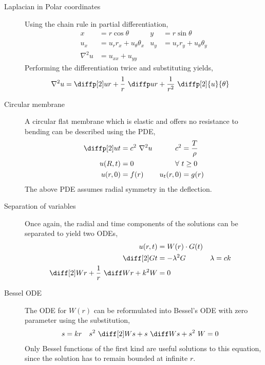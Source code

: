 \begin{description}
    \item[Laplacian in Polar coordinates] Using the chain rule in partial
        differentiation,
        \begin{align}
            x          & = r \cos \theta               &
            y          & = r \sin \theta                 \\
            u_x        & = u_r r_x + u_\theta \theta_x &
            u_y        & = u_r r_y + u_\theta \theta_y   \\
            \nabla^2 u & = u_{xx} + u_{yy}
        \end{align}
        Performing the differentiation twice and substituting yields,
        \begin{align}
            \nabla^2 u & = \diffp[2] ur + \frac{1}{r}\ \diffp ur + \frac{1}{r^2}
            \ \diffp[2] {u}{\theta}
        \end{align}

    \item[Circular membrane] A circular flat membrane which is elastic and offers no
        resistance to bending can be described using the PDE,
        \begin{align}
            \diffp[2] ut & = c^2\ \nabla^2 u & c^2       & = \frac{T}{\rho} \\
            u(R, t)      & = 0               & \forall\  & t \geq 0         \\
            u(r, 0)      & = f(r)            & u_t(r, 0) & = g(r)           \\
        \end{align}
        The above PDE assumes radial symmetry in the deflection.

    \item[Separation of variables] Once again, the radial and time components of the
        solutions can be separated to yield two ODEs,
        \begin{align}
            u(r, t)                                    & = W(r) \cdot G(t)   \\
            \diff[2] Gt                                & = -\lambda^2 G    &
            \lambda                                    & = ck                \\
            \diff[2] Wr + \frac{1}{r}\ \diff Wr + k^2W & = 0
        \end{align}

    \item[Bessel ODE] The ODE for $ W(r) $ can be reformulated into Bessel's ODE with
        zero parameter using the substitution,
        \begin{align}
            s                                       & = kr &
            s^2\ \diff[2] Ws + s\ \diff Ws + s^2\ W & = 0
        \end{align}
        Only Bessel functions of the first kind are useful solutions to this equation,
        since the solution has to remain bounded at infinite $ r $.


\end{description}
